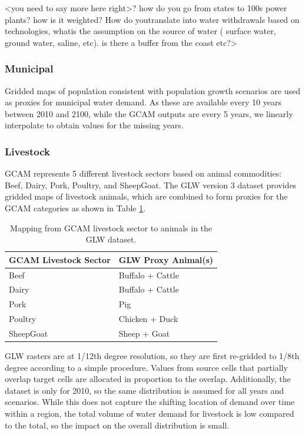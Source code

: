 \documentclass[fleqn,10pt]{wlscirep}
\begin{document}
<you need to say more here right>? how do you go from states to 100s power plants? how is it weighted? How do youtranslate into water withdrawals based on technologies, whatis the assumption on the source of water ( surface water, ground water, saline, etc). is there a buffer from the coast etc?>

\subsubsection*{Municipal}

Gridded maps of population consistent with population growth scenarios \cite{Jones_2016} are used as proxies for municipal water demand. As these are available every 10 years between 2010 and 2100, while the GCAM outputs are every 5 years, we linearly interpolate to obtain values for the missing years.

\subsubsection*{Livestock}

GCAM represents 5 different livestock sectors based on animal commodities: Beef, Dairy, Pork, Poultry, and SheepGoat. The GLW version 3 dataset\cite{Gilbert2018} provides gridded maps of livestock animals, which are combined to form proxies for the GCAM categories as shown in Table \ref{tab:livestock}.

\begin{table}[ht]
\centering
\begin{tabular}{ll}
\hline
\textbf{GCAM Livestock Sector} & \textbf{GLW Proxy Animal(s)} \\
\hline
Beef & Buffalo + Cattle \\
Dairy & Buffalo + Cattle \\
Pork & Pig \\
Poultry & Chicken + Duck \\
SheepGoat & Sheep + Goat \\
\hline
\end{tabular}
\caption{\label{tab:livestock}Mapping from GCAM livestock sector to animals in the GLW dataset.}
\end{table}

GLW rasters are at 1/12th degree resolution, so they are first re-gridded to 1/8th degree according to a simple procedure. Values from source cells that partially overlap target cells are allocated in proportion to the overlap. Additionally, the dataset is only for 2010, so the same distribution is assumed for all years and scenarios. While this does not capture the shifting location of demand over time within a region, the total volume of water demand for livestock is low compared to the total, so the impact on the overall distribution is small.
\end{document}
